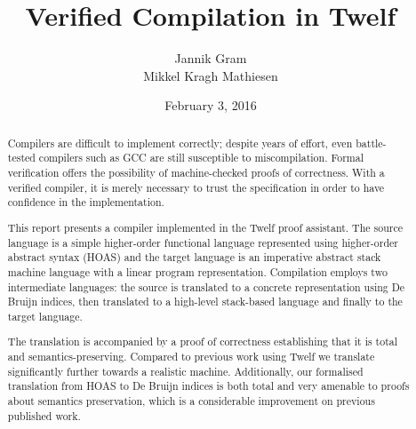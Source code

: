 \title{Verified Compilation in Twelf}
\author{Jannik Gram\\Mikkel Kragh Mathiesen}
\date{February 3, 2016}

\thispagestyle{empty}

\maketitle

\begin{abstract}
Compilers are difficult to implement correctly; despite years of effort, even battle-tested compilers such as GCC are still susceptible to miscompilation.
Formal verification offers the possibility of machine-checked proofs of correctness.
With a verified compiler, it is merely necessary to trust the specification in order to have confidence in the implementation.

This report presents a compiler implemented in the Twelf proof assistant.
The source language is a simple higher-order functional language represented using higher-order abstract syntax (HOAS) and the target language is an imperative abstract stack machine language with a linear program representation.
Compilation employs two intermediate languages: the source is translated to a concrete representation using De Bruijn indices, then translated to a high-level stack-based language and finally to the target language.

The translation is accompanied by a proof of correctness establishing that it is total and semantics-preserving.
Compared to previous work using Twelf we translate significantly further towards a realistic machine.
Additionally, our formalised translation from HOAS to De Bruijn indices is both total and very amenable to proofs about semantics preservation, which is a considerable improvement on previous published work.

\end{abstract}

\clearpage

\thispagestyle{empty}

\tableofcontents

\clearpage

